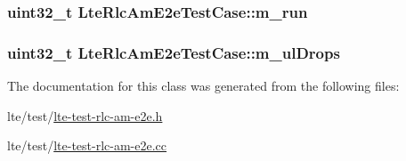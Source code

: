 \subsubsection[{\texorpdfstring{m\+\_\+run}{m_run}}]{\setlength{\rightskip}{0pt plus 5cm}uint32\+\_\+t Lte\+Rlc\+Am\+E2e\+Test\+Case\+::m\+\_\+run\hspace{0.3cm}{\ttfamily [private]}}\hypertarget{classLteRlcAmE2eTestCase_af47c853d67661e384fbed678b588a6e5}{}\label{classLteRlcAmE2eTestCase_af47c853d67661e384fbed678b588a6e5}
\subsubsection[{\texorpdfstring{m\+\_\+ul\+Drops}{m_ulDrops}}]{\setlength{\rightskip}{0pt plus 5cm}uint32\+\_\+t Lte\+Rlc\+Am\+E2e\+Test\+Case\+::m\+\_\+ul\+Drops\hspace{0.3cm}{\ttfamily [private]}}\hypertarget{classLteRlcAmE2eTestCase_a341e4ba269f052efbd439ebacf09e6f0}{}\label{classLteRlcAmE2eTestCase_a341e4ba269f052efbd439ebacf09e6f0}


The documentation for this class was generated from the following files\+:\begin{DoxyCompactItemize}
\item 
lte/test/\hyperlink{lte-test-rlc-am-e2e_8h}{lte-\/test-\/rlc-\/am-\/e2e.\+h}\item 
lte/test/\hyperlink{lte-test-rlc-am-e2e_8cc}{lte-\/test-\/rlc-\/am-\/e2e.\+cc}\end{DoxyCompactItemize}
